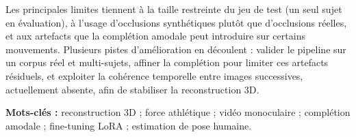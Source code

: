 \documentclass[11pt,a4paper]{article}
\begin{document}
Les principales limites tiennent à la taille restreinte du jeu de test (un seul sujet en évaluation), 
à l'usage d'occlusions synthétiques plutôt que d'occlusions réelles, et aux artefacts que la complétion 
amodale peut introduire sur certains mouvements. Plusieurs pistes d'amélioration en découlent : valider le pipeline sur 
un corpus réel et multi-sujets, affiner la complétion pour limiter ces artefacts résiduels, et exploiter 
la cohérence temporelle entre images successives, actuellement absente, afin de stabiliser la reconstruction 3D.

\vspace{1em}

\noindent\textbf{Mots-clés :} reconstruction 3D ; force athlétique ; vidéo monoculaire ;
complétion amodale ; fine-tuning LoRA ; estimation de pose humaine.
\end{document}
